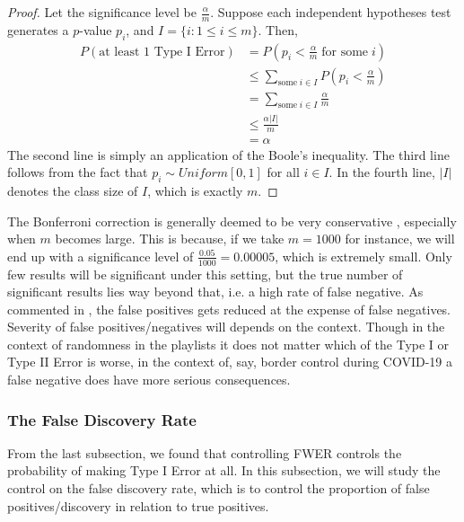 \documentclass[12pt]{article}
\theoremstyle{plain}
\theoremstyle{definition}
\theoremstyle{remark}
\begin{document}
\begin{proof}\cite{5.3}
Let the significance level be $\frac{\alpha}{m}$. Suppose each independent hypotheses test generates a $p$-value $p_i$, and $I=\{i:1\leq i\leq m\}$. Then,
\begin{align*}
    P(\text{at least 1 Type I Error})&=P(p_i<\frac{\alpha}{m}\; \text{for some} \;i)\\
    &\leq\sum_{\text{some}\; i\in I} P(p_i<\frac{\alpha}{m})\\
    &=\sum_{\text{some}\; i\in I}\frac{\alpha}{m}\\
    &\leq\frac{\alpha|I|}{m}\\
    &=\alpha
\end{align*}
The second line is simply an application of the Boole's inequality. The third line follows from the fact that $p_i\sim Uniform[0,1]$ for all $i\in I$. In the fourth line, $|I|$ denotes the class size of $I$, which is exactly $m$. 
\end{proof}

The Bonferroni correction is generally deemed to be very conservative \cite{5.4}\cite{5.1}\cite{5.3}\cite{5.5}\cite{5.6}, especially when $m$ becomes large. This is because, if we take $m=1000$ for instance, we will end up with a significance level of $\frac{0.05}{1000}=0.00005$, which is extremely small. Only few results will be significant under this setting, but the true number of significant results lies way beyond that, i.e. a high rate of false negative. As commented in \cite{5.5}, the false positives gets reduced at the expense of false negatives. Severity of false positives/negatives will depends on the context. Though in the context of randomness in the playlists it does not matter which of the Type I or Type II Error is worse, in the context of, say, border control during COVID-19 a false negative does have more serious consequences.

\newpage
\subsubsection{The False Discovery Rate}
From the last subsection, we found that controlling FWER controls the probability of making Type I Error at all. In this subsection, we will study the control on the false discovery rate, which is to control the proportion of false positives/discovery in relation to true positives. 
\end{document}
